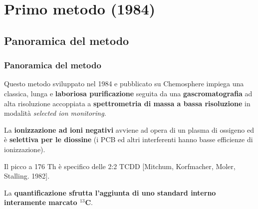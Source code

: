 \section{Primo metodo (1984)}\logo{}
\subsection{Panoramica del metodo}\begin{frame}\frametitle{Panoramica del metodo}

Questo metodo\cite{1984} sviluppato nel 1984 e pubblicato su Chemosphere impiega una classica, lunga e  {\bf laboriosa purificazione} seguita da una  {\bf gascromatografia} ad alta risoluzione accoppiata a  {\bf spettrometria di massa a bassa risoluzione} in modalità \emph{selected ion monitoring}. 
\pause

La  {\bf ionizzazione ad ioni negativi} avviene ad opera di un plasma di ossigeno ed è  {\bf selettiva per le diossine} (i PCB ed altri interferenti hanno basse efficienze di ionizzazione).

Il picco a 176 Th è specifico delle 2:2 TCDD [Mitchum, Korfmacher, Moler, Stalling. 1982].\pause

La  {\bf quantificazione sfrutta l'aggiunta di uno standard interno interamente marcato $^{13}$C}. 

\begin{figure}{}\end{figure}


\end{frame}

